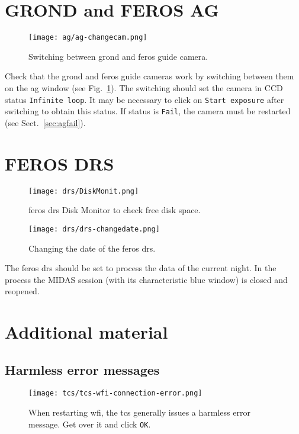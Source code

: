 \documentclass[11pt,fleqn]{book} %
\begin{document}
\section{GROND and FEROS AG}
\begin{figure}[ht!]
\centering
\texttt{[image: ag/ag-changecam.png]}
\caption[Switching between GROND and FEROS guide cameras]{Switching between \gls{grond} and \gls{feros} guide camera.}
\label{fig:agswitch}
\end{figure}
Check that the \gls{grond} and \gls{feros} guide cameras work by
switching between them on the \gls{ag} window (see Fig.~\ref{fig:agswitch}).
The switching should set the camera in CCD status \texttt{Infinite loop}.  It 
may be necessary to click on \texttt{Start exposure} after switching to
obtain this status.  If status is \texttt{Fail}, the camera must be restarted (see 
Sect.~\ref{sec:agfail}).

\section{FEROS DRS}
\begin{figure}[ht!]
\centering
\texttt{[image: drs/DiskMonit.png]}
\caption{\gls{feros} \gls{drs} Disk Monitor to check free disk space.}
\label{fig:diskmonit}
\end{figure}

\begin{figure}[ht!]
\centering
\texttt{[image: drs/drs-changedate.png]}
\caption{Changing the date of the \gls{feros} \gls{drs}.}
\label{fig:drsswitch}
\end{figure}
The \gls{feros} \gls{drs} should be set to process the data of the 
current night.  In the process the MIDAS session (with its characteristic
blue window) is closed and reopened.  

\section{Additional material}
\subsection{Harmless error messages}
\begin{figure}[ht!]
\centering
\texttt{[image: tcs/tcs-wfi-connection-error.png]}
\caption[Harmless error message of the TCS during WFI restart]{When restarting \gls{wfi}, the \gls{tcs} generally issues a harmless
error message.  Get over it and click \texttt{OK}.}
\label{fig:wfistarterror}
\end{figure}
\end{document}
